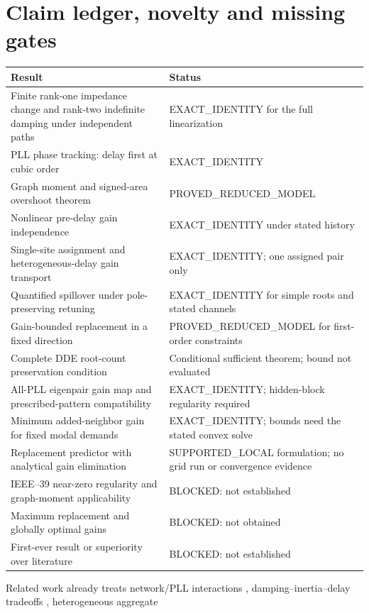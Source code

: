 \documentclass[11pt]{article}
\begin{document}
\section{Claim ledger, novelty and missing gates}
\begin{center}\small
\begin{tabular}{p{.49\linewidth}p{.43\linewidth}}
\toprule
Result & Status\\\midrule
Finite rank-one impedance change and rank-two indefinite damping
under independent paths & EXACT\_IDENTITY for the full linearization\\
PLL phase tracking: delay first at cubic order & EXACT\_IDENTITY\\
Graph moment and signed-area overshoot theorem & PROVED\_REDUCED\_MODEL\\
Nonlinear pre-delay gain independence & EXACT\_IDENTITY under stated history\\
Single-site assignment and heterogeneous-delay gain transport
& EXACT\_IDENTITY; one assigned pair only\\
Quantified spillover under pole-preserving retuning
& EXACT\_IDENTITY for simple roots and stated channels\\
Gain-bounded replacement in a fixed direction
& PROVED\_REDUCED\_MODEL for first-order constraints\\
Complete DDE root-count preservation condition
& Conditional sufficient theorem; bound not evaluated\\
All-PLL eigenpair gain map and prescribed-pattern compatibility
& EXACT\_IDENTITY; hidden-block regularity required\\
Minimum added-neighbor gain for fixed modal demands
& EXACT\_IDENTITY; bounds need the stated convex solve\\
Replacement predictor with analytical gain elimination
& SUPPORTED\_LOCAL formulation; no grid run or convergence evidence\\
IEEE--39 near-zero regularity and graph-moment applicability
& BLOCKED: not established\\
Maximum replacement and globally optimal gains & BLOCKED: not obtained\\
First-ever result or superiority over literature & BLOCKED: not established\\
\bottomrule
\end{tabular}
\end{center}
Related work already treats network/PLL interactions \cite{huang},
damping--inertia--delay tradeoffs \cite{pates}, heterogeneous aggregate
\end{document}
